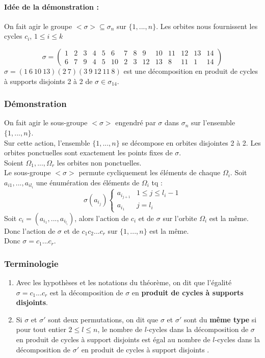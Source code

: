 \documentclass[a4paper, oneside]{report}
\theoremstyle{break}
\newcommand{\pcsd}{produit de cycles à support disjoints }
\newcommand{\dem}{\subsubsection{Démonstration}}
\begin{document}
\paragraph{Idée de la démonstration :}
On fait agir le groupe $<\sigma> \subseteq \sigma_n$ sur $\{1,...,n\}$. Les orbites nous fournissent les cycles $c_i$, $1\leq i \leq k$

\exem
$$\sigma = \left(\begin{array}{llllllllllllll}
1&2&3&4&5&6&7&8&9&10&11&12&13&14\\
6&7&9&4&5&10&2&3&12&13&8&11&1&14
\end{array}\right)$$
$\sigma = (1~6~10~13)(2~7)(3~9~12~11~8)$ est une décomposition en produit de cycles à supports disjoints 2 à 2 de $\sigma \in \sigma_{14}$.

\dem
On fait agir le sous-groupe $<\sigma>$ engendré par $\sigma$ dans $\sigma_n$ sur l'ensemble $\{1,...,n\}$.\\
Sur cette action, l'ensemble $\{1,...,n\}$ se décompose en orbites disjointes 2 à 2. Les orbites ponctuelles sont exactement les points fixes de $\sigma$.\\
Soient $\Omega_1,...,\Omega_r$ les orbites non ponctuelles.\\
Le sous-groupe $<\sigma>$ permute cycliquement les éléments de chaque $\Omega_i$. Soit $a_{i1},...,a_{il_i}$ une énumération des éléments de $\Omega_i$ tq :
$$\sigma(a_{i_j})\left\{\begin{array}{ll}
a_{i_{j+1}}&1\leq j \leq l_i-1\\
a_{i_1}&j=l_i
\end{array}\right. $$
Soit $c_i=(a_{i_1},...,a_{i_{l_i}})$, alors l'action de $c_i$ et de $\sigma$ sur l'orbite $\Omega_i$ est la même.\\
Donc l'action de $\sigma$ et de $c_1c_2...c_r$ sur $\{1,...,n\}$ est la même.\\
Donc $\sigma=c_1...c_r$.

\subsubsection{Terminologie}
\begin{enumerate}
\item Avec les hypothèses et les notations du théorème, on dit que l'égalité $\sigma=c_1...c_r$ est la décomposition de $\sigma$ en \textbf{produit de cycles à supports disjoints}.

\item Si $\sigma$ et $\sigma '$ sont deux permutations, on dit que $\sigma$ et $\sigma '$ sont du \textbf{même type} si pour tout entier $2\leq l \leq n$, le nombre de $l$-cycles dans la décomposition de $\sigma$ en produit de cycles à support disjoints est égal au nombre de $l$-cycles dans la décomposition de $\sigma '$ en \pcsd.
\end{enumerate}
\end{document}
